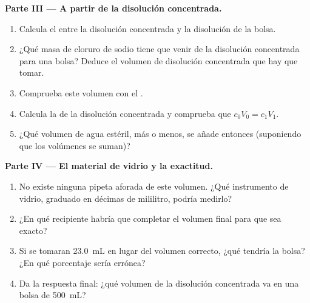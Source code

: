 \begin{problem}
\medskip
\noindent\textbf{Parte III --- A partir de la disolución concentrada.}
\begin{enumerate}[resume]
  \item Calcula el  entre la disolución concentrada y
        la disolución de la bolsa.
  \item ¿Qué masa de cloruro de sodio tiene que venir de la disolución
        concentrada para una bolsa? Deduce el volumen de disolución
        concentrada que hay que tomar.
  \item Comprueba este volumen con el .
  \item Calcula la  de la disolución concentrada y
        comprueba que $c_0 V_0 = c_1 V_1$.
  \item ¿Qué volumen de agua estéril, más o menos, se añade entonces
        (suponiendo que los volúmenes se suman)?
\end{enumerate}

\medskip
\noindent\textbf{Parte IV --- El material de vidrio y la exactitud.}
\begin{enumerate}[resume]
  \item No existe ninguna pipeta aforada de este volumen. ¿Qué
        instrumento de vidrio, graduado en décimas de mililitro, podría
        medirlo?
  \item ¿En qué recipiente habría que completar el volumen final para
        que sea exacto?
  \item Si se tomaran \qty{23.0}{mL} en lugar del volumen correcto, ¿qué
         tendría la bolsa? ¿En qué porcentaje sería
        errónea?
  \item Da la respuesta final: ¿qué volumen de la disolución concentrada
        va en una bolsa de \qty{500}{mL}?
\end{enumerate}
\end{problem}

